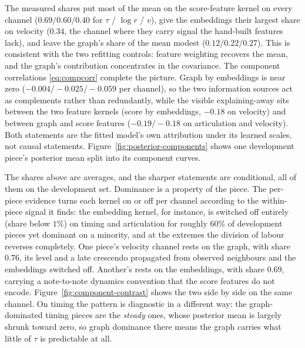 The measured shares put most of the mean on the score-feature kernel on every
channel ($0.69/0.60/0.40$ for $\tau$ / $\log r$ / $v$), give the embeddings
their largest share on velocity ($0.34$, the channel where they carry signal
the hand-built features lack), and leave the graph's share of the mean modest
($0.12/0.22/0.27$). This is consistent with the two refitting controls:
feature weighting recovers the mean, and the graph's contribution
concentrates in the covariance. The component correlations
\eqref{eq:compcorr} complete the picture. Graph by embeddings is near zero
($-0.004/-0.025/-0.059$ per channel), so the two information sources act as
complements rather than redundantly, while the visible explaining-away sits
between the two feature kernels (score by embeddings, $-0.18$ on velocity)
and between graph and score features ($-0.19/-0.18$ on articulation and
velocity). Both statements are the fitted model's own attribution under its
learned scales, not causal statements. Figure~\ref{fig:posterior-components}
shows one development piece's posterior mean split into its component curves.


The shares above are averages, and the sharper statements are conditional,
all of them on the development set. Dominance is a property of the piece. The
per-piece evidence turns each kernel on or off per channel according to the
within-piece signal it finds: the embedding kernel, for instance, is switched
off entirely (share below $1\%$) on timing and articulation for roughly 60\%
of development pieces yet dominant on a minority, and at the extremes the
division of labour reverses completely. One piece's velocity channel rests on
the graph, with share $0.76$, its level and a late crescendo propagated from
observed neighbours and the embeddings switched off. Another's rests on the
embeddings, with share $0.69$, carrying a note-to-note dynamics convention
that the score features do not encode. Figure~\ref{fig:component-contrast}
shows the two side by side on the same channel. On timing the pattern is
diagnostic in a different way: the graph-dominated timing pieces are the
\emph{steady} ones, whose posterior mean is largely shrunk toward zero, so
graph dominance there means the graph carries what little of $\tau$ is
predictable at all.

